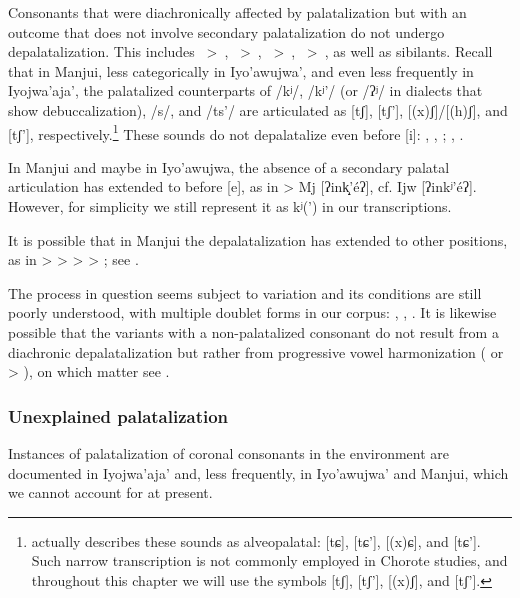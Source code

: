 Consonants that were diachronically affected by palatalization but with an outcome that does not involve secondary palatalization do not undergo depalatalization. This includes ~>~, ~>~, ~>~, ~>~, as well as sibilants. Recall that in Manjui, less categorically in Iyo’awujwa’, and even less frequently in Iyojwa’aja’, the palatalized counterparts of /kʲ/, /kʲ’/ (or /ʔʲ/ in dialects that show debuccalization), /s/, and /ts’/ are articulated as [tʃ], [tʃ’], [(x)ʃ]/[(h)ʃ], and [tʃ’], respectively.\footnote{\citet[79]{JC14b} actually describes these sounds as alveopalatal: [tɕ], [tɕ’], [(x)ɕ], and [tɕ’]. Such narrow transcription is not commonly employed in Chorote studies, and throughout this chapter we will use the symbols [tʃ], [tʃ’], [(x)ʃ], and [tʃ’].} These sounds do not depalatalize even before [i]: , , ; , .

In Manjui and maybe in Iyo'awujwa, the absence of a secondary palatal articulation has extended to  before [e], as in  > Mj [ʔink̝̝’éʔ], cf. Ijw [ʔinkʲ’éʔ]. However, for simplicity we still represent it as kʲ(’) in our transcriptions.

It is possible that in Manjui the depalatalization has extended to other positions, as in  >  >  >  > ; see . 

The process in question seems subject to variation and its conditions are still poorly understood, with multiple doublet forms in our corpus: , , . It is likewise possible that the variants with a non-palatalized consonant do not result from a diachronic depalatalization but rather from progressive vowel harmonization ( or  > ), on which matter see \citet{JC-amer}.

\subsubsection{Unexplained palatalization}\label{ch-unexpl}

Instances of palatalization of coronal consonants in the environment  are documented in Iyojwa’aja’ and, less frequently, in Iyo'awujwa' and Manjui, which we cannot account for at present.

